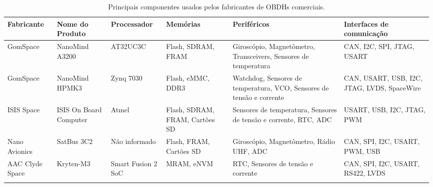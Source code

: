 \begin{table}[htb]
    \centering
	\ABNTEXfontereduzida
	\caption{\label{tab:Tab_Rev}Principais componentes usados pelos fabricantes de OBDHs comerciais.}
    \begin{tabular}{@{}p{2cm}p{2.6cm}p{2cm}p{2cm}p{2.2cm}p{2.6cm}@{}}
		\toprule
		\textbf{Fabricante} & \textbf{Nome do Produto} & \textbf{Processador} & \textbf{Memórias} & \textbf{Periféricos} & \textbf{Interfaces de comunicação} \\ 
        \midrule
        GomSpace & NanoMind A3200 & AT32UC3C & Flash, SDRAM, FRAM & Giroscópio, Magnetômetro, Transceivers, Sensores de temperatura & CAN, I2C, SPI, JTAG, USART \\%
        
        \midrule
        GomSpace & NanoMind HPMK3 & Zynq 7030 & Flash, eMMC, DDR3 & Watchdog, Sensores de temperatura, VCO, Sensores de tensão e corrente & CAN, USART, USB, I2C, JTAG, LVDS, SpaceWire \\ %

        \midrule
        ISIS Space & ISIS On Board Computer & Atmel & Flash, SDRAM, FRAM, Cartões SD & Sensores de temperatura, Sensores de tensão e corrente, RTC, ADC & USART, USB, I2C, JTAG, PWM \\ %

        \midrule
        Nano Avionics & SatBus 3C2 & Não informado & Flash, FRAM, Cartões SD & Giroscópio, Magnetômetro, Rádio UHF, ADC & CAN, SPI, I2C, USART, PWM, USB \\ %

        \midrule
        AAC Clyde Space & Kryten-M3 & Smart Fusion 2 SoC & MRAM, eNVM & RTC, Sensores de tensão e corrente & CAN, SPI, I2C, USART, RS422, LVDS \\ %


		
        \\ \bottomrule
	\end{tabular}
\end{table}

